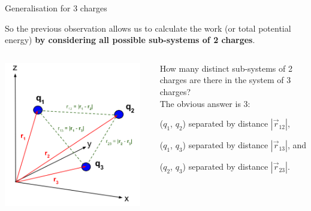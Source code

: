 \begin{frame}{Generalisation for 3 charges}

So the previous observation allows us to calculate the work
(or total potential energy) {\bf by considering all possible sub-systems of 2 charges}.\\

\begin{columns}
  \begin{column}{0.55\textwidth}
   \begin{center}
     \includegraphics[width=0.95\textwidth]{./images/schematics/work_3_charges_with_distances.png}\\
   \end{center}
  \end{column}
  \begin{column}{0.45\textwidth}
     How many distinct sub-systems of 2 charges are there in the system of 3 charges?\\
     \vspace{0.3cm}
     The obvious answer is 3:
     \begin{itemize}
     {
        \item ($q_1$, $q_2$) separated by distance $|\vec{r}_{12}|$,
        \item ($q_1$, $q_3$) separated by distance $|\vec{r}_{13}|$, and
        \item ($q_2$, $q_3$) separated by distance $|\vec{r}_{23}|$.\\
     }
     \end{itemize}
  \end{column}
\end{columns}

\end{frame}

